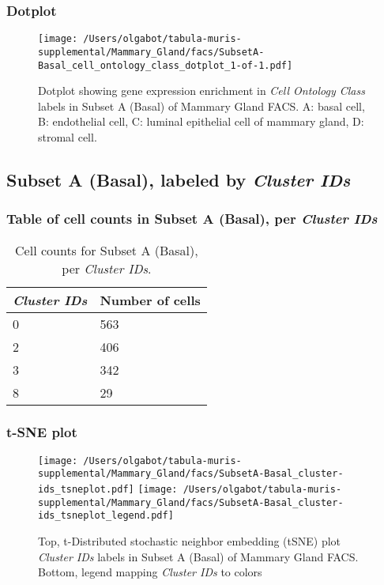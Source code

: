 \clearpage

\subsubsection{Dotplot}
\begin{figure}[h]
\centering
\texttt{[image: /Users/olgabot/tabula-muris-supplemental/Mammary\_Gland/facs/SubsetA-Basal\_cell\_ontology\_class\_dotplot\_1-of-1.pdf]}

\caption{ Dotplot  showing gene expression enrichment in \emph{Cell Ontology Class} labels in Subset A (Basal) of Mammary Gland FACS. A: basal cell, B: endothelial cell, C: luminal epithelial cell of mammary gland, D: stromal cell.}
\end{figure}


\clearpage

\subsection{Subset A (Basal), labeled by \emph{Cluster IDs}}
\subsubsection{Table of cell counts in Subset A (Basal), per \emph{Cluster IDs}}\begin{table}[h]
\centering
\label{my-label}
\begin{tabular}{@{}ll@{}}
\toprule

\emph{Cluster IDs}& Number of cells \\ \midrule
0 & 563 \\

2 & 406 \\

3 & 342 \\

8 & 29 \\
\bottomrule
\end{tabular}
\caption{Cell counts for Subset A (Basal), per \emph{Cluster IDs}.}
\end{table}

\clearpage
\subsubsection{t-SNE plot}
\begin{figure}[h]
\centering
\texttt{[image: /Users/olgabot/tabula-muris-supplemental/Mammary\_Gland/facs/SubsetA-Basal\_cluster-ids\_tsneplot.pdf]}
\texttt{[image: /Users/olgabot/tabula-muris-supplemental/Mammary\_Gland/facs/SubsetA-Basal\_cluster-ids\_tsneplot\_legend.pdf]}
\caption{Top, t-Distributed stochastic neighbor embedding (tSNE) plot  \emph{Cluster IDs} labels in Subset A (Basal) of Mammary Gland FACS. Bottom, legend mapping \emph{Cluster IDs} to colors}
\end{figure}


